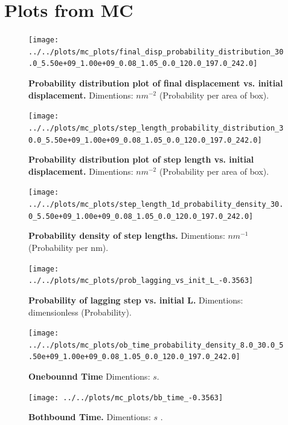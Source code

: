\documentclass[9pt,twocolumn,twoside]{article}
\begin{document}
\section*{Plots from MC}
\begin{figure}[tbhp]
\centering
\texttt{[image: ../../plots/mc\_plots/final\_disp\_probability\_distribution\_30.0\_5.50e+09\_1.00e+09\_0.08\_1.05\_0.0\_120.0\_197.0\_242.0]}
\caption{\textbf{Probability distribution plot of final displacement vs. initial displacement.} Dimentions: $nm^{-2}$ (Probability per area of box).}
\label{fig:final_disp_prob}
\end{figure}

\begin{figure}[tbhp]
\centering
\texttt{[image: ../../plots/mc\_plots/step\_length\_probability\_distribution\_30.0\_5.50e+09\_1.00e+09\_0.08\_1.05\_0.0\_120.0\_197.0\_242.0]}
\caption{\textbf{Probability distribution plot of step length vs. initial displacement.} Dimentions: $nm^{-2}$ (Probability per area of box).}
\label{fig:step_length_prob}
\end{figure}

\begin{figure}[tbhp]
\centering
\texttt{[image: ../../plots/mc\_plots/step\_length\_1d\_probability\_density\_30.0\_5.50e+09\_1.00e+09\_0.08\_1.05\_0.0\_120.0\_197.0\_242.0]}
\caption{\textbf{Probability density of step lengths.} Dimentions: $nm^{-1}$ (Probability per nm).}
\label{fig:step_length_prob_den}
\end{figure}

\begin{figure}[tbhp]
\centering
\texttt{[image: ../../plots/mc\_plots/prob\_lagging\_vs\_init\_L\_-0.3563]}
\caption{\textbf{Probability of lagging step vs. initial L.} Dimentions: dimensionless (Probability).}
\label{fig:prob_lagging}
\end{figure}

\begin{figure}[tbhp]
\centering
\texttt{[image: ../../plots/mc\_plots/ob\_time\_probability\_density\_8.0\_30.0\_5.50e+09\_1.00e+09\_0.08\_1.05\_0.0\_120.0\_197.0\_242.0]}
\caption{\textbf{Onebounnd Time} Dimentions: $s$.}
\label{fig:ob_time}
\end{figure}

\begin{figure}[tbhp]
\centering
\texttt{[image: ../../plots/mc\_plots/bb\_time\_-0.3563]}
\caption{\textbf{Bothbound Time.} Dimentions: $s$ .}
\label{fig:bothbound_time}
\end{figure}
\end{document}
